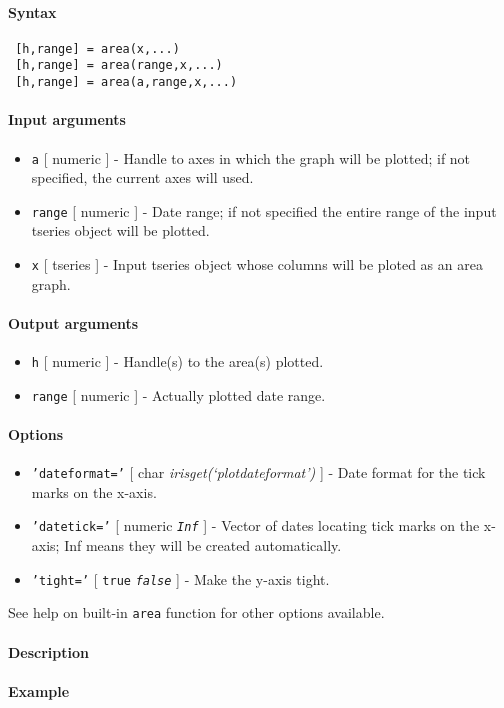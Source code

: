 


	\paragraph{Syntax}
 
 \begin{verbatim}
 [h,range] = area(x,...)
 [h,range] = area(range,x,...)
 [h,range] = area(a,range,x,...)
 \end{verbatim}
 
 \paragraph{Input arguments}
 
 \begin{itemize}
 \item
   \texttt{a} {[} numeric {]} - Handle to axes in which the graph will be
   plotted; if not specified, the current axes will used.
 \item
   \texttt{range} {[} numeric {]} - Date range; if not specified the
   entire range of the input tseries object will be plotted.
 \item
   \texttt{x} {[} tseries {]} - Input tseries object whose columns will
   be ploted as an area graph.
 \end{itemize}
 
 \paragraph{Output arguments}
 
 \begin{itemize}
 \item
   \texttt{h} {[} numeric {]} - Handle(s) to the area(s) plotted.
 \item
   \texttt{range} {[} numeric {]} - Actually plotted date range.
 \end{itemize}
 
 \paragraph{Options}
 
 \begin{itemize}
 \item
   \texttt{'dateformat='} {[} char \textbar{}
   \emph{irisget(`plotdateformat')} {]} - Date format for the tick marks
   on the x-axis.
 \item
   \texttt{'datetick='} {[} numeric \textbar{} \emph{\texttt{Inf}} {]} -
   Vector of dates locating tick marks on the x-axis; Inf means they will
   be created automatically.
 \item
   \texttt{'tight='} {[} \texttt{true} \textbar{} \emph{\texttt{false}}
   {]} - Make the y-axis tight.
 \end{itemize}
 
 See help on built-in \texttt{area} function for other options available.
 
 \paragraph{Description}
 
 \paragraph{Example}


